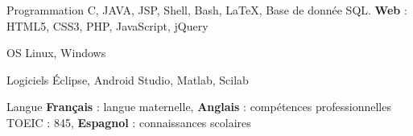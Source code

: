 

\begin{cvskills}

	\cvskill
		{Programmation} %
		{C, JAVA, JSP, Shell, Bash, \LaTeX, Base de donnée SQL. \textbf{Web} : HTML5, CSS3, PHP, JavaScript, jQuery } %


	\cvskill
		{OS} %
		{Linux, Windows} %

	\cvskill
	    {Logiciels} %
	    {Éclipse, Android Studio, Matlab, Scilab} %

  \cvskill
    {Langue} %
    {\textbf{Français} : langue maternelle, \textbf{Anglais}  : compétences professionnelles TOEIC : 845, \textbf{Espagnol} : connaissances scolaires} %

\end{cvskills}
